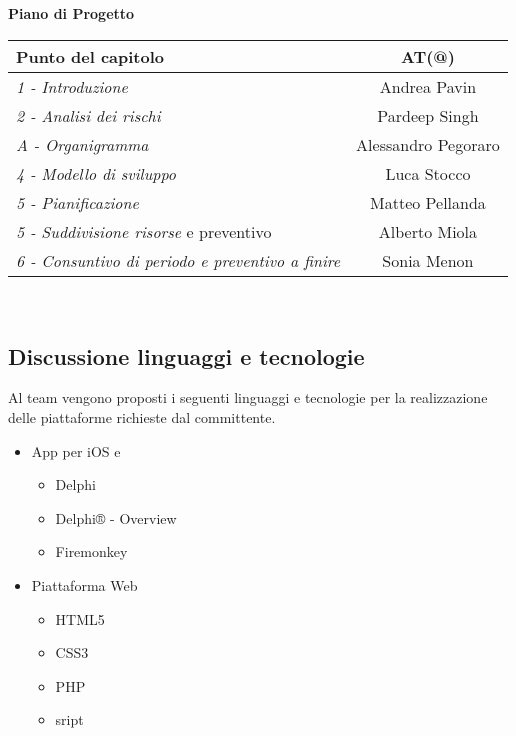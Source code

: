 	\textbf{Piano di Progetto}\\[0.25cm]
	\begin{tabular}{  l | c }
		\hline
		\textbf{Punto del capitolo}&\textbf{AT(@)}\\
		\hline
		\emph{1 - Introduzione} & Andrea Pavin  \\ \emph{2 - Analisi dei rischi} & Pardeep Singh\\ \emph{A - Organigramma} & Alessandro Pegoraro\\
		\hline
		\emph{4 - Modello di sviluppo} & Luca Stocco  \\ \emph{5 - Pianificazione} & Matteo Pellanda\\
		\hline
		\emph{5 - Suddivisione risorse} e preventivo & Alberto Miola\\ \emph{6 - Consuntivo di periodo e preventivo a finire} & Sonia Menon\\
		\hline
	\end{tabular}
	\\
\subsection{Discussione linguaggi e tecnologie}
	Al team vengono proposti i seguenti linguaggi e tecnologie per la realizzazione delle piattaforme richieste dal committente.
	\begin{itemize}
		\item App per iOS e 
			\begin{itemize}
				\item Delphi
				\item Delphi® - Overview  
				\item Firemonkey  
			\end{itemize}
		\item Piattaforma Web
			\begin{itemize}
				\item HTML5 
				\item CSS3
				\item PHP
				\item {}sript
			\end{itemize}
	\end{itemize}
